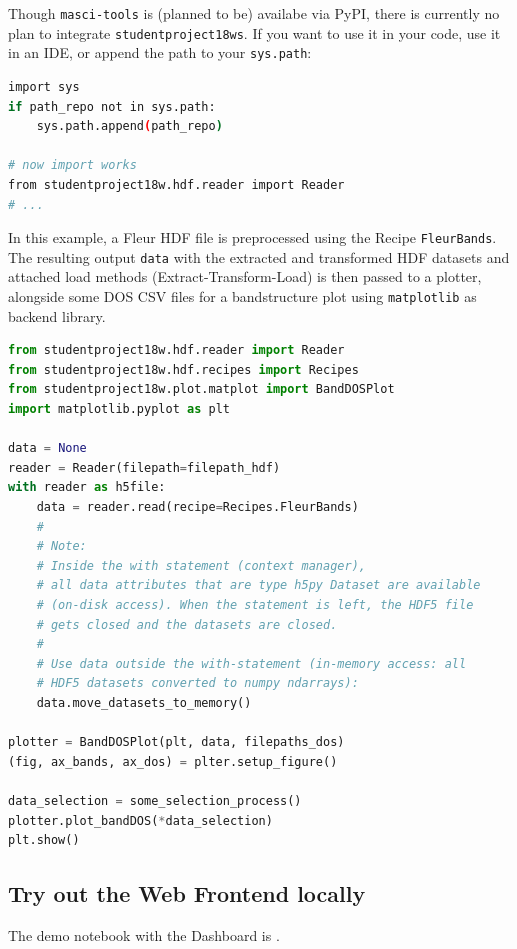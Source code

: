Though \texttt{masci-tools} is (planned to be) availabe via PyPI, there is
currently no plan to integrate \texttt{studentproject18ws}. If you want to use
it in your code, use it in an IDE, or append the path to your
\texttt{sys.path}:

\begin{lstlisting}[language=bash, style=code]
import sys
if path_repo not in sys.path:
    sys.path.append(path_repo)
    
# now import works
from studentproject18w.hdf.reader import Reader
# ...
\end{lstlisting}

In this example, a Fleur HDF file is preprocessed using the Recipe
\texttt{FleurBands}. The resulting output \texttt{data} with the
extracted and transformed HDF datasets and attached load methods
(Extract-Transform-Load) is then passed to a plotter, alongside some DOS
CSV files for a bandstructure plot using \texttt{matplotlib} as backend
library.

\begin{lstlisting}[language=python, style=code]
from studentproject18w.hdf.reader import Reader
from studentproject18w.hdf.recipes import Recipes
from studentproject18w.plot.matplot import BandDOSPlot
import matplotlib.pyplot as plt

data = None
reader = Reader(filepath=filepath_hdf)
with reader as h5file:
    data = reader.read(recipe=Recipes.FleurBands)
    #
    # Note:
    # Inside the with statement (context manager),
    # all data attributes that are type h5py Dataset are available
    # (on-disk access). When the statement is left, the HDF5 file 
    # gets closed and the datasets are closed.
    #
    # Use data outside the with-statement (in-memory access: all 
    # HDF5 datasets converted to numpy ndarrays):
    data.move_datasets_to_memory()

plotter = BandDOSPlot(plt, data, filepaths_dos)
(fig, ax_bands, ax_dos) = plter.setup_figure()

data_selection = some_selection_process()
plotter.plot_bandDOS(*data_selection)
plt.show()
\end{lstlisting}

\subsection{Try out the Web Frontend
  locally}\label{try-out-web-frontend-locally}

The demo notebook with the Dashboard is
.

